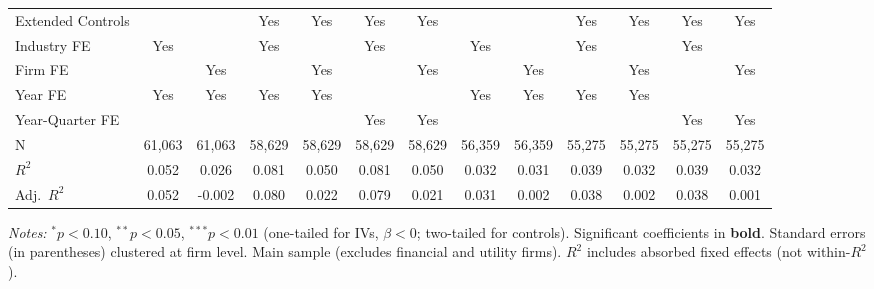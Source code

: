 \begin{landscape}
\begin{table}[H]
\begin{tabular}{lcccccccccccc}
Extended Controls &  &  & Yes & Yes & Yes & Yes &  &  & Yes & Yes & Yes & Yes \\
Industry FE & Yes &  & Yes &  & Yes &  & Yes &  & Yes &  & Yes &  \\
Firm FE &  & Yes &  & Yes &  & Yes &  & Yes &  & Yes &  & Yes \\
Year FE & Yes & Yes & Yes & Yes &  &  & Yes & Yes & Yes & Yes &  &  \\
Year-Quarter FE &  &  &  &  & Yes & Yes &  &  &  &  & Yes & Yes \\
\midrule
N & 61,063 & 61,063 & 58,629 & 58,629 & 58,629 & 58,629 & 56,359 & 56,359 & 55,275 & 55,275 & 55,275 & 55,275 \\
$R^2$ & 0.052 & 0.026 & 0.081 & 0.050 & 0.081 & 0.050 & 0.032 & 0.031 & 0.039 & 0.032 & 0.039 & 0.032 \\
Adj.~$R^2$ & 0.052 & -0.002 & 0.080 & 0.022 & 0.079 & 0.021 & 0.031 & 0.002 & 0.038 & 0.002 & 0.038 & 0.001 \\
\bottomrule
\end{tabular}
\begin{minipage}{\linewidth}
\vspace{2pt}\scriptsize
\textit{Notes:} $^{*}p<0.10$, $^{**}p<0.05$, $^{***}p<0.01$ (one-tailed for IVs, $\beta < 0$; two-tailed for controls).
 Significant coefficients in \textbf{bold}.
 Standard errors (in parentheses) clustered at firm level.
 Main sample (excludes financial and utility firms).
 $R^2$ includes absorbed fixed effects (not within-$R^2$).
\end{minipage}
\end{table}
\end{landscape}